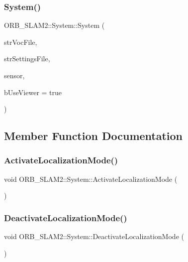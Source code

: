\subsubsection{\texorpdfstring{System()}{System()}}
{\footnotesize\ttfamily O\+R\+B\+\_\+\+S\+L\+A\+M2\+::\+System\+::\+System (\begin{DoxyParamCaption}\item[{const string \&}]{str\+Voc\+File,  }\item[{const string \&}]{str\+Settings\+File,  }\item[{const \mbox{\hyperlink{class_o_r_b___s_l_a_m2_1_1_system_a3f14b84bb9663e1129e649e592bd14cf}{e\+Sensor}}}]{sensor,  }\item[{const bool}]{b\+Use\+Viewer = {\ttfamily true} }\end{DoxyParamCaption})}



\subsection{Member Function Documentation}
\mbox{\label{class_o_r_b___s_l_a_m2_1_1_system_a6cd39ec31a23d7ba5ebe1a6e4f4a0f89}} 
\subsubsection{\texorpdfstring{Activate\+Localization\+Mode()}{ActivateLocalizationMode()}}
{\footnotesize\ttfamily void O\+R\+B\+\_\+\+S\+L\+A\+M2\+::\+System\+::\+Activate\+Localization\+Mode (\begin{DoxyParamCaption}{ }\end{DoxyParamCaption})}

\mbox{\label{class_o_r_b___s_l_a_m2_1_1_system_a3bb91bfb9547b01596dac3e9fdd4adfd}} 
\subsubsection{\texorpdfstring{Deactivate\+Localization\+Mode()}{DeactivateLocalizationMode()}}
{\footnotesize\ttfamily void O\+R\+B\+\_\+\+S\+L\+A\+M2\+::\+System\+::\+Deactivate\+Localization\+Mode (\begin{DoxyParamCaption}{ }\end{DoxyParamCaption})}


